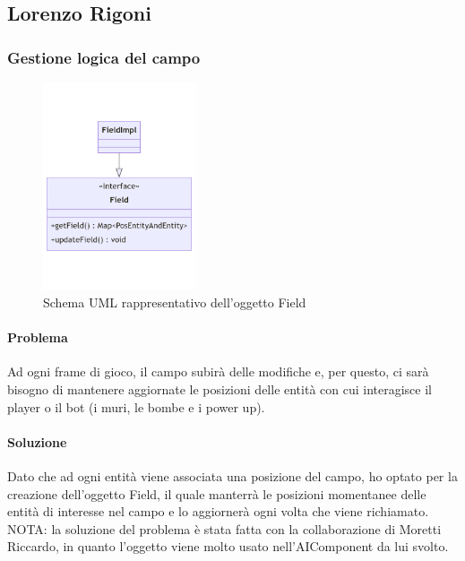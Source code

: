 \documentclass[a4paper,12pt]{report}
\begin{document}

\subsection*{Lorenzo Rigoni}

\subsubsection{Gestione logica del campo}

\begin{figure}[H]
    \centering{}
    \includegraphics[width=0.4\textwidth]{img/UMLGestioneCampo.png}
    \caption{Schema UML rappresentativo dell'oggetto Field}
    \label{}
\end{figure}

\paragraph{Problema} Ad ogni frame di gioco, il campo subirà delle modifiche e, per questo, ci sarà bisogno di mantenere aggiornate le posizioni delle entità con cui interagisce il player o il bot (i muri, le bombe e i power up).

\paragraph{Soluzione} Dato che ad ogni entità viene associata una posizione del campo, ho optato per la creazione dell’oggetto Field, il quale manterrà le posizioni momentanee delle entità di interesse nel campo e lo aggiornerà ogni volta che viene richiamato.
\\
NOTA: la soluzione del problema è stata fatta con la collaborazione di Moretti Riccardo, in quanto l’oggetto viene molto usato nell’AIComponent da lui svolto.
\end{document}
